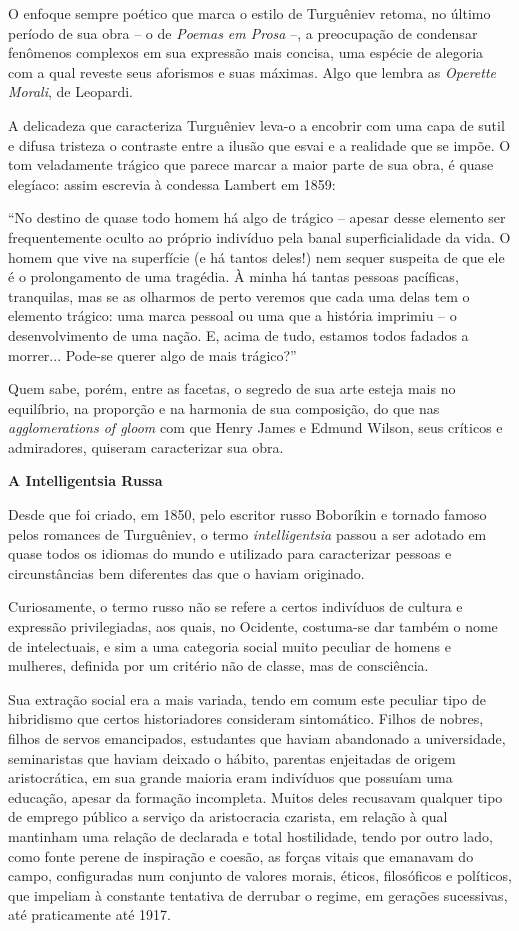 O enfoque sempre poético que marca o estilo de Turguêniev retoma, no
último período de sua obra -- o de \emph{Poemas em Prosa} --, a
preocupação de condensar fenômenos complexos em sua expressão mais
concisa, uma espécie de alegoria com a qual reveste seus aforismos e
suas máximas. Algo que lembra as \emph{Operette Morali}, de Leopardi.

A delicadeza que caracteriza Turguêniev leva-o a encobrir com uma capa
de sutil e difusa tristeza o contraste entre a ilusão que esvai e a
realidade que se impõe. O tom veladamente trágico que parece marcar a
maior parte de sua obra, é quase elegíaco: assim escrevia à condessa
Lambert em 1859:

``No destino de quase todo homem há algo de trágico -- apesar desse
elemento ser frequentemente oculto ao próprio indivíduo pela banal
superficialidade da vida. O homem que vive na superfície (e há tantos
deles!) nem sequer suspeita de que ele é o prolongamento de uma
tragédia. À minha há tantas pessoas pacíficas, tranquilas, mas se as
olharmos de perto veremos que cada uma delas tem o elemento trágico: uma
marca pessoal ou uma que a história imprimiu -- o desenvolvimento de uma
nação. E, acima de tudo, estamos todos fadados a morrer... Pode-se
querer algo de mais trágico?''

Quem sabe, porém, entre as facetas, o segredo de sua arte esteja mais no
equilíbrio, na proporção e na harmonia de sua composição, do que nas
\emph{agglomerations of gloom} com que Henry James e Edmund Wilson, seus
críticos e admiradores, quiseram caracterizar sua obra.

\textbf{A Intelligentsia Russa}

Desde que foi criado, em 1850, pelo escritor russo Boboríkin e tornado
famoso pelos romances de Turguêniev, o termo \emph{intelligentsia}
passou a ser adotado em quase todos os idiomas do mundo e utilizado para
caracterizar pessoas e circunstâncias bem diferentes das que o haviam
originado.

Curiosamente, o termo russo não se refere a certos indivíduos de cultura
e expressão privilegiadas, aos quais, no Ocidente, costuma-se dar também
o nome de intelectuais, e sim a uma categoria social muito peculiar de
homens e mulheres, definida por um critério não de classe, mas de
consciência.

Sua extração social era a mais variada, tendo em comum este peculiar
tipo de hibridismo que certos historiadores consideram sintomático.
Filhos de nobres, filhos de servos emancipados, estudantes que haviam
abandonado a universidade, seminaristas que haviam deixado o hábito,
parentas enjeitadas de origem aristocrática, em sua grande maioria eram
indivíduos que possuíam uma educação, apesar da formação incompleta.
Muitos deles recusavam qualquer tipo de emprego público a serviço da
aristocracia czarista, em relação à qual mantinham uma relação de
declarada e total hostilidade, tendo por outro lado, como fonte perene
de inspiração e coesão, as forças vitais que emanavam do campo,
configuradas num conjunto de valores morais, éticos, filosóficos e
políticos, que impeliam à constante tentativa de derrubar o regime, em
gerações sucessivas, até praticamente até 1917.

